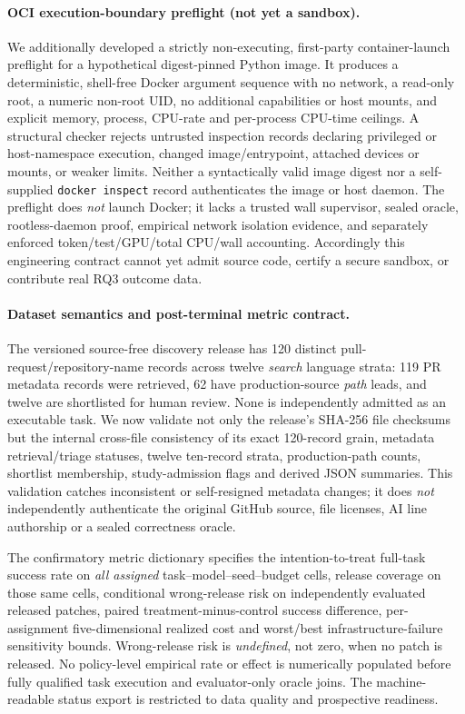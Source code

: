 \documentclass[pdflatex,sn-basic]{sn-jnl}
\begin{document}
\paragraph{OCI execution-boundary preflight (not yet a sandbox).}
We additionally developed a strictly non-executing,
first-party container-launch preflight for a
hypothetical digest-pinned Python image. It produces
a deterministic, shell-free Docker argument sequence
with no network, a read-only root, a numeric non-root
UID, no additional capabilities or host mounts, and
explicit memory, process, CPU-rate and per-process
CPU-time ceilings. A structural checker rejects
untrusted inspection records declaring privileged or
host-namespace execution, changed image/entrypoint,
attached devices or mounts, or weaker limits.
Neither a syntactically valid image digest nor a
self-supplied \texttt{docker inspect} record authenticates
the image or host daemon. The preflight does
\emph{not} launch Docker; it lacks a trusted wall
supervisor, sealed oracle, rootless-daemon proof,
empirical network isolation evidence, and separately
enforced token/test/GPU/total CPU/wall accounting.
Accordingly this engineering contract cannot yet
admit source code, certify a secure sandbox, or
contribute real RQ3 outcome data.

\paragraph{Dataset semantics and post-terminal metric contract.}
The versioned source-free discovery release has 120 distinct
pull-request/repository-name records across twelve \emph{search}
language strata: 119 PR metadata records were retrieved,
62 have production-source \emph{path} leads, and twelve are
shortlisted for human review. None is independently
admitted as an executable task. We now validate not only
the release's SHA-256 file checksums but the internal
cross-file consistency of its exact 120-record grain,
metadata retrieval/triage statuses, twelve ten-record
strata, production-path counts, shortlist membership,
study-admission flags and derived JSON summaries.
This validation catches inconsistent or self-resigned
metadata changes; it does \emph{not} independently
authenticate the original GitHub source, file licenses,
AI line authorship or a sealed correctness oracle.

The confirmatory metric dictionary specifies the
intention-to-treat full-task success rate on \emph{all
assigned} task--model--seed--budget cells, release
coverage on those same cells, conditional wrong-release
risk on independently evaluated released patches,
paired treatment-minus-control success difference,
per-assignment five-dimensional realized cost and
worst/best infrastructure-failure sensitivity bounds.
Wrong-release risk is \emph{undefined}, not zero, when
no patch is released. No policy-level empirical
rate or effect is numerically populated before
fully qualified task execution and evaluator-only
oracle joins. The machine-readable status export is
restricted to data quality and prospective readiness.
\end{document}
